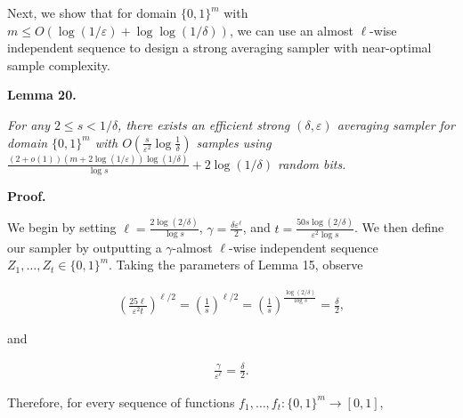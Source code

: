 Next, we show that for domain $\{0,1\}^{m}$ with $m\leq O(\log(1/\varepsilon)+\log\log(1/\delta))$, we can use an almost $\ell$-wise independent sequence to design a strong averaging sampler with near-optimal sample complexity.\par





\par\medskip\noindent\textbf{
\textbf{Lemma 20}\textbf{.}
}\par



\emph{For any $2\leq s<1/\delta$, there exists an efficient strong $(\delta,\varepsilon)$ averaging sampler for domain $\{0,1\}^{m}$ with $O(\frac{s}{\varepsilon^{2}}\log\frac{1}{\delta})$ samples using
${\frac{(2+o(1))(m+2\log(1/\varepsilon))\log(1/\delta)}{\log s}}+2\log(1/\delta)$
random bits.}\par







\par\medskip\noindent\textbf{Proof.}\par




We begin by setting $\ell=\frac{2\log(2/\delta)}{\log s}$, $\gamma=\frac{\delta\varepsilon^{\ell}}{2}$, and $t=\frac{50s\log(2/\delta)}{\varepsilon^{2}\log s}$. We then define our sampler by outputting a $\gamma$-almost $\ell$-wise independent sequence $Z_{1},\dots,Z_{t}\in\{0,1\}^{m}$.
Taking the parameters of Lemma 15, observe\par


\[\begin{gathered}
\left(\frac{25{\ell}}{\varepsilon^{2}{t}}\right)^{\ell/2}=\left(\frac{1}{s}\right)^{\ell/2}=\left(\frac{1}{s}\right)^{\frac{\log(2/\delta)}{\log s}}=\frac{\delta}{2},
\end{gathered}\]


and\par


\[\begin{gathered}
\frac{\gamma}{\varepsilon^{\ell}}=\frac{\delta}{2}.
\end{gathered}\]


Therefore, for every sequence of functions $f_{1},\dots,f_{t}:\{0,1\}^{m}\to[0,1]$,\par


